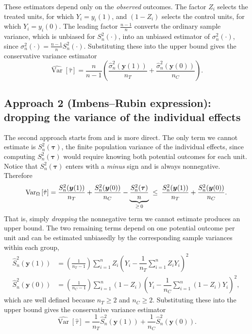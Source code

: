 \documentclass[12pt,leqno]{article}
\theoremstyle{newstyle}
\DeclareMathOperator{\Var}{\mathrm{Var}}
\newcommand{\bZ}{\bm{Z}}   \newcommand{\bz}{\bm{z}}   %
\newcommand{\po}[2]{y_{#1}(#2)}     %
\newcommand{\pov}[1]{\bm{y}(#1)}    %
\newcommand{\tauhat}{\hat{\tau}}
\newcommand{\Ssq}[2][n]{S_{#1}^{2}(#2)}
\newcommand{\ssq}[2][n]{\sigma_{#1}^{2}(#2)}
\newcommand{\Ssqhat}[2][n]{\widehat{S}_{#1}^{2}(#2)}
\newcommand{\ssqhat}[2][n]{\widehat{\sigma}_{#1}^{2}(#2)}
\newcommand{\Varhat}{\widehat{\Var}}
\begin{document}
\normalsize
These estimators depend only on the \textit{observed} outcomes. The factor $Z_i$ selects the treated units, for which $Y_i = \po{i}{1}$, and $(1 - Z_i)$ selects the control units, for which $Y_i = \po{i}{0}$. The leading factor $\frac{n - 1}{n}$ converts the ordinary sample variance, which is unbiased for $\Ssq{\cdot}$, into an unbiased estimator of $\ssq{\cdot}$, since $\ssq{\cdot} = \frac{n - 1}{n}\Ssq{\cdot}$. Substituting these into the upper bound gives the conservative variance estimator
\begin{equation} \label{eq: conservative var est}
\Varhat\left[\tauhat\right] = \dfrac{n}{n - 1}\left(\dfrac{\ssqhat{\pov{1}}}{n_T} + \dfrac{\ssqhat{\pov{0}}}{n_C}\right).
\end{equation}

\subsection{Approach 2 (Imbens--Rubin expression): dropping the variance of the individual effects}

The second approach starts from  and is more direct. The only term we cannot estimate is $\Ssq{\bm{\tau}}$, the finite population variance of the individual effects, since computing $\Ssq{\bm{\tau}}$ would require knowing both potential outcomes for each unit. Notice that $\Ssq{\bm{\tau}}$ enters with a \textit{minus} sign and is always nonnegative. Therefore
\begin{equation*}
\VarZ\left[\tauhat\right] = \dfrac{\Ssq{\pov{1}}}{n_T} + \dfrac{\Ssq{\pov{0}}}{n_C} - \underbrace{\dfrac{\Ssq{\bm{\tau}}}{n}}_{\geq \, 0} \; \leq \; \dfrac{\Ssq{\pov{1}}}{n_T} + \dfrac{\Ssq{\pov{0}}}{n_C}.
\end{equation*}
That is, simply \textit{dropping} the nonnegative term we cannot estimate produces an upper bound. The two remaining terms depend on one potential outcome per unit and can be estimated unbiasedly by the corresponding sample variances within each group,
\small
\begin{align*}
\Ssqhat{\pov{1}} & = \left(\frac{1}{n_T - 1}\right) \sum \limits_{i = 1}^n Z_i \left(Y_i - \dfrac{1}{n_T} \sum \limits_{i = 1}^n Z_i Y_i \right)^2 \\
\Ssqhat{\pov{0}} & = \left(\frac{1}{n_C - 1}\right) \sum \limits_{i = 1}^n (1 - Z_i) \left(Y_i - \dfrac{1}{n_C} \sum \limits_{i = 1}^n (1 - Z_i) Y_i\right)^2,
\end{align*}
\normalsize
which are well defined because $n_T \geq 2$ and $n_C \geq 2$. Substituting these into the upper bound gives the conservative variance estimator
\begin{equation}
\label{eq: conserv var est}
\Varhat\left[\tauhat\right] = \frac{1}{n_T} \Ssqhat{\pov{1}} + \frac{1}{n_C} \Ssqhat{\pov{0}}.
\end{equation}
\end{document}

